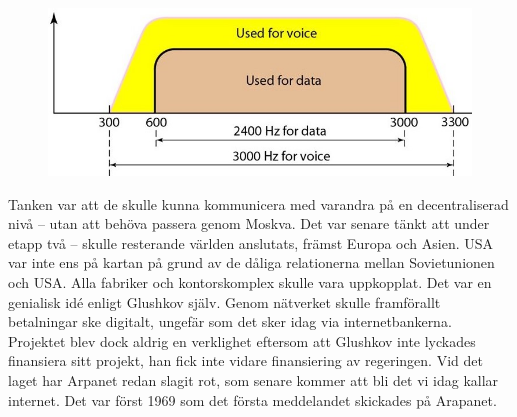 \documentclass[a4paper,11pt]{article}
\begin{document}
\begin{figure}
  \vspace{-7pt}
  \centering
  \includegraphics[width=1.0\linewidth]{Bilder/bandbredd.jpg}
\end{figure}

Tanken var att de skulle kunna kommunicera med varandra på en decentraliserad
nivå -- utan att behöva passera genom Moskva. Det var senare tänkt att under
etapp två -- skulle resterande världen anslutats, främst Europa och Asien. USA
var inte ens på kartan på grund av de dåliga relationerna mellan Sovietunionen
och USA. Alla fabriker och kontorskomplex skulle vara uppkopplat. Det var en
genialisk idé enligt Glushkov själv. Genom nätverket skulle framförallt
betalningar ske digitalt, ungefär som det sker idag via internetbankerna.
Projektet blev dock aldrig en verklighet eftersom att Glushkov inte lyckades
finansiera sitt projekt, han fick inte vidare finansiering av regeringen. Vid
det laget har Arpanet redan slagit rot, som senare kommer att bli det vi idag
kallar internet. Det var först 1969 som det första meddelandet skickades på
Arapanet.
\end{document}
